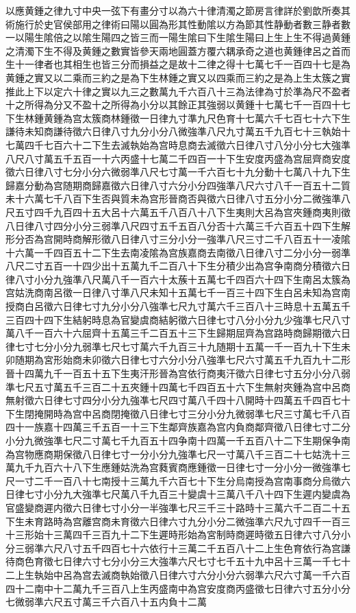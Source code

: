 以應黄鍾之律九寸中央一弦下有畫分寸以為六十律清濁之節房言律詳於劉歆所奏其術施行於史官侯部用之律術曰陽以圓為形其性動隂以方為節其性静動者數三静者數一以陽生隂倍之以隂生陽四之皆三而一陽生隂曰下生隂生陽曰上生上生不得過黄鍾之清濁下生不得及黄鍾之數實皆參天兩地圓蓋方覆六耦承奇之道也黄鍾律呂之首而生十一律者也其相生也皆三分而損益之是故十二律之得十七萬七千一百四十七是為黄鍾之實又以二乘而三約之是為下生林鍾之實又以四乘而三約之是為上生太簇之實推此上下以定六十律之實以九三之數萬九千六百八十三為法律為寸於準為尺不盈者十之所得為分又不盈十之所得為小分以其餘正其強弱以黄鍾十七萬七千一百四十七下生林鍾黄鍾為宫太簇商林鍾徵一日律九寸準九尺色育十七萬六千七百七十六下生謙待未知商謙待徵六日律八寸九分小分八微強準八尺九寸萬五千九百七十三執始十七萬四千七百六十二下生去滅執始為宫時息商去滅徵六日律八寸八分小分七大強準八尺八寸萬五千五百一十六丙盛十七萬二千四百一十下生安度丙盛為宫屈齊商安度徵六日律八寸七分小分六微弱準八尺七寸萬一千六百七十九分動十七萬八十九下生歸嘉分動為宫随期商歸嘉徵六日律八寸六分小分四強準八尺六寸八千一百五十二質未十六萬七千八百下生否與質未為宫形晉商否與徵六日律八寸五分小分二微強準八尺五寸四千九百四十五大呂十六萬五千八百八十八下生夷則大呂為宫夾鍾商夷則徵八日律八寸四分小分三弱準八尺四寸五千五百八分否十六萬三千六百五十四下生解形分否為宫開時商解形徵八日律八寸三分小分一強準八尺三寸二千八百五十一凌隂十六萬一千四百五十二下生去南凌隂為宫族嘉商去南徵八日律八寸二分小分一弱準八尺二寸五百一十四少出十五萬九千二百八十下生分積少出為宫争南商分積徵六日律八寸小分九強準八尺萬八千一百六十太蔟十五萬七千四百六十四下生南呂太簇為宫姑洗商南呂徵一日律八寸準八尺未知十五萬七千一百三十四下生白呂未知為宫南授商白呂徵六日律七寸九分小分八強準七尺九寸萬六千三百八十三時息十五萬五千三百四十四下生結躬時息為官變虞商結躬徵六日律七寸八分小分九少強準七尺八寸萬八千一百六十六屈齊十五萬三千二百五十三下生歸期屈齊為宫路時商歸期徵六日律七寸七分小分九弱準七尺七寸萬六千九百三十九随期十五萬一千一百九十下生未卯随期為宮形始商未卯徵六日律七寸六分小分八強準七尺六寸萬五千九百九十二形晉十四萬九千一百五十五下生夷汗形晉為宫依行商夷汗徵六日律七寸五分小分八弱準七尺五寸萬五千三百二十五夾鍾十四萬七千四百五十六下生無射夾鍾為宫中呂商無射徵六日律七寸四分小分九強凖七尺四寸萬八千四十八開時十四萬五千四百七十下生閉掩開時為宫中呂商閉掩徵八日律七寸三分小分九微弱準七尺三寸萬七千八百四十一族嘉十四萬三千五百一十三下生鄰齊族嘉為宫内負商鄰齊徵八日律七寸二分小分九微強準七尺二寸萬七千九百五十四争南十四萬一千五百八十二下生期保争南為宫物應商期保徵八日律七寸一分小分九強準七尺一寸萬八千三百二十七姑洗十三萬九千九百六十八下生應鍾姑洗為宫蕤賓商應鍾徵一日律七寸一分小分一微強準七尺一寸二千一百八十七南授十三萬九千六百七十下生分烏南授為宫南事商分烏徵六日律七寸小分九大強準七尺萬八千九百三十變虞十三萬八千八十四下生遲内變虞為官盛變商遲内徵六日律七寸小分一半強準七尺三千三十路時十三萬六千二百二十五下生未育路時為宫離宫商未育徵六日律六寸九分小分二微強準六尺九寸四千一百三十三形始十三萬四千三百九十二下生遲時形始為宮制時商遲時徵五日律六寸八分小分三弱準六尺八寸五千四百七十六依行十三萬二千五百八十二上生色育依行為宫謙待商色育徵七日律六寸七分小分三大強準六尺七寸七千五十九中呂十三萬一千七十二上生執始中呂為宫去滅商執始徵八日律六寸六分小分六弱準六尺六寸萬一千六百四十二南中十二萬九千三百八上生丙盛南中為宫安度商丙盛徵七日律六寸五分小分七微弱準六尺五寸萬三千六百八十五内負十二萬